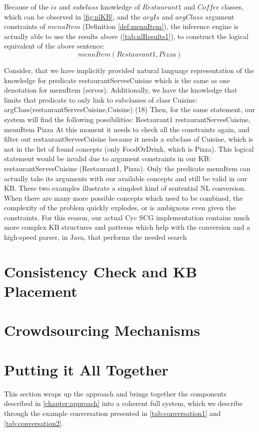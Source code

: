 Because of the $is$ and $subclass$ knowledge of $Restaurant1$ and $Coffee$ 
classes, which can be observed in \autoref{fig:nlKB}, and the $argIs$ and 
$argClass$ argument constraints of $menuItem$ (Definition \ref{def:menuItem}), 
the inference engine is actually able to use the results above 
(\autoref{tab:nlResults1}), to construct the logical equivalent of the above 
sentence: 
\begin{equation*}
menuItem(Restaurant1, Pizza)
\end{equation*}

Consider, that we have implicitly provided natural language representation of the knowledge for predicate restaurantServesCuisine which is the same as one denotation for menuItem (serves). Additionally, we have the knowledge that limits that predicate to only link to subclasses of class Cuisine:
	argClass(restaurantServesCuisine,Cuisine)	(18)
Then, for the same statement, our system will find the following possibilities:
	Restaurant1
	restaurantServesCuisine, menuItem
	Pizza
At this moment it needs to check all the constraints again, and filter out restaurantServesCuisine because it needs a subclass of Cuisine, which is not in the list of found concepts (only FoodOrDrink, which is Pizza). This logical statement would be invalid due to argument constraints in our KB: restaurantServesCuisine (Restaurant1, Pizza). Only the predicate menuItem can actually take its arguments with our available concepts and still be valid in our KB.
These two examples illustrate a simplest kind of sentential NL conversion. When there are many more possible concepts which need to be combined, the complexity of the problem quickly explodes, or is ambiguous even given the constraints. For this reason, our actual Cyc SCG implementation contains much more complex KB structures and patterns which help with the conversion and a high-speed parser, in Java, that performs the needed search


\section{Consistency Check and KB Placement}
\label{section:consistency}

\section{Crowdsourcing Mechanisms}
\label{section:crowdsourcing}

\section{Putting it All Together}
\label{section:together}
This section wraps up the approach and brings together the components described
in \autoref{chapter:approach} into a coherent full system, which we describe 
through the example conversation presented in \autoref{tab:conversation1} and
\autoref{tab:conversation2}.

